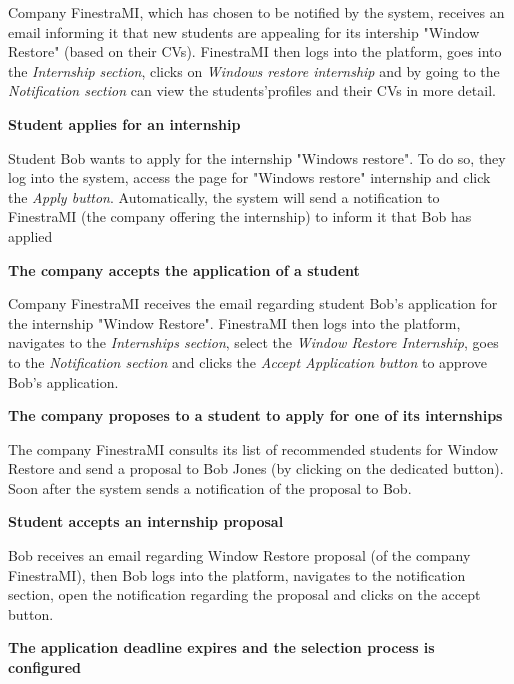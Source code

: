 			\begin{flushleft}
				Company FinestraMI, which has chosen to be notified by the system, receives an email informing it that new students are appealing for its intership "Window Restore" (based on their CVs). FinestraMI then logs into the platform, goes into the \emph{Internship section}, clicks on \emph{Windows restore internship} and by going to the \emph{Notification section} can view the students'profiles and their CVs in more detail.
			\end{flushleft}
			\textbf{Student applies for an internship}
			\begin{flushleft}
				Student Bob wants to apply for the internship "Windows restore". To do so, they log into the system, access the page for "Windows restore" internship and click the \emph{Apply button}. Automatically, the system will send a notification to FinestraMI (the company offering the internship) to inform it that Bob has applied
			\end{flushleft}
			\textbf{The company accepts the application of a student}
			\begin{flushleft}
				Company FinestraMI receives the email regarding student Bob's application for the internship "Window Restore". FinestraMI then logs into the platform, navigates to the \emph{Internships section}, select the \emph{Window Restore Internship}, goes to the \emph{Notification section} and clicks the \emph{Accept Application button} to approve Bob's application.
			\end{flushleft}
			\textbf{The company proposes to a student to apply for one of its internships}
			\begin{flushleft}
				The company FinestraMI consults its list of recommended students for Window Restore and send a proposal to Bob Jones (by clicking on the dedicated button). Soon after the system sends a notification of the proposal to Bob. 
			\end{flushleft}
			\textbf{Student accepts an internship proposal}
			\begin{flushleft}
				Bob receives an email regarding Window Restore proposal (of the company FinestraMI), then Bob logs into the platform, navigates to the notification section, open the notification regarding the proposal and clicks on the accept button.
			\end{flushleft}
			\textbf{The application deadline expires and the selection process is configured}
